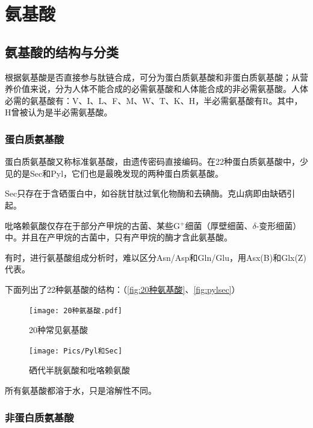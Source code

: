\section{氨基酸}

\subsection{氨基酸的结构与分类}

根据氨基酸是否直接参与肽链合成，可分为蛋白质氨基酸和非蛋白质氨基酸；从营养价值来说，分为人体不能合成的必需氨基酸和人体能合成的非必需氨基酸。人体必需的氨基酸有：V、I、L、F、M、W、T、K、H，半必需氨基酸有R。其中，H曾被认为是半必需氨基酸。

\begin{qj}[：必需氨基酸的记忆]
	
\end{qj}

\subsubsection{蛋白质氨基酸}

蛋白质氨基酸又称标准氨基酸，由遗传密码直接编码。在22种蛋白质氨基酸中，少见的是Sec和Pyl，它们也是最晚发现的两种蛋白质氨基酸。

Sec只存在于含硒蛋白中，如谷胱甘肽过氧化物酶和去碘酶。克山病即由缺硒引起。

吡咯赖氨酸仅存在于部分产甲烷的古菌、某些G$^{+}$细菌（厚壁细菌、$\delta$-变形细菌）中。并且在产甲烷的古菌中，只有产甲烷的酶才含此氨基酸。

有时，进行氨基酸组成分析时，难以区分Asn/Asp和Gln/Glu，用Asx(B)和Glx(Z)代表。

下面列出了22种氨基酸的结构：（\autoref{fig:20种氨基酸}、\autoref{fig:pylsec}）

\begin{figure}[htbp]
	\centering
	\texttt{[image: 20种氨基酸.pdf]}
	\caption{20种常见氨基酸}
	\label{fig:20种氨基酸}
\end{figure}

\begin{figure}[htbp]
	\centering
	\texttt{[image: Pics/Pyl和Sec]}
	\caption{硒代半胱氨酸和吡咯赖氨酸}
	\label{fig:pylsec}
\end{figure}


所有氨基酸都溶于水，只是溶解性不同。

\subsubsection{非蛋白质氨基酸}

